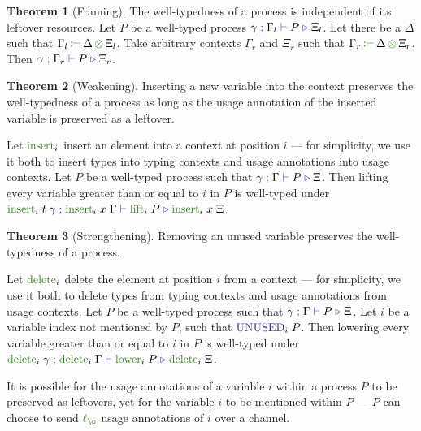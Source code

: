 \documentclass[a4paper,UKenglish,cleveref,autoref,thm-restate,authorcolumns]{lipics-v2019}
\theoremstyle{definition}
\newtheorem{nitheorem}{Theorem}
\newcommand{\type}[1]{\textcolor{BlueViolet}{\operatorname{#1}}}
\newcommand{\func}[1]{\textcolor{OliveGreen}{\operatorname{#1}}}
\newcommand{\opctx}[3]{#1 \, \func{\coloneqq} \, #2 \, \func{\otimes} \, #3}
\newcommand{\lz}{\func{\ell_{\o}}}
\newcommand{\types}[4]{#1 \; \type{;} \; #2 \; \type{\vdash} \; #3 \; \type{\triangleright} \; #4}
\newcommand{\Unused}{\type{UNUSED}}
\begin{document}
\begin{nitheorem}[Framing]
  \label{thm:framing}
  The well-typedness of a process is independent of its leftover resources.
  Let $P$ be a well-typed process $\types{\gamma}{\Gamma_l}{P}{\Xi_l}$.
  Let there be a $\Delta$ such that $\opctx{\Gamma_l}{\Delta}{\Xi_l}$.
  Take arbitrary contexts $\Gamma_r$ and $\Xi_r$ such that $\opctx{\Gamma_r}{\Delta}{\Xi_r}$.
  Then $\types{\gamma}{\Gamma_r}{P}{\Xi_r}$.
\end{nitheorem}

\begin{nitheorem}[Weakening]
  \label{thm:weakening}
  Inserting a new variable into the context preserves the well-typedness of a process as long as the usage annotation of the inserted variable is preserved as a leftover.

  Let $\func{insert}_i$ insert an element into a context at position $i$ --- for simplicity, we use it both to insert types into typing contexts and usage annotations into usage contexts.
  Let $P$ be a well-typed process such that $\types{\gamma}{\Gamma}{P}{\Xi}$.
  Then lifting every variable greater than or equal to $i$ in $P$ is well-typed under $\types{\func{insert}_i \; t \; \gamma}{\func{insert}_i \; x \; \Gamma}{\func{lift}_i \; P}{\func{insert}_i \; x \; \Xi}$.
\end{nitheorem}

\begin{nitheorem}[Strengthening]
  \label{thm:strengthening}
  Removing an unused variable preserves the well-typedness of a process.

  Let $\func{delete}_i$ delete the element at position $i$ from a context --- for simplicity, we use it both to delete types from typing contexts and usage annotations from usage contexts.
  Let $P$ be a well-typed process such that $\types{\gamma}{\Gamma}{P}{\Xi}$.
  Let $i$ be a variable index not mentioned by $P$, such that $\Unused_i \; P$.
  Then lowering every variable greater than or equal to $i$ in $P$ is well-typed under $\types{\func{delete}_i \; \gamma}{\func{delete}_i \; \Gamma}{\func{lower}_i \; P}{\func{delete}_i \; \Xi}$.
\end{nitheorem}

\begin{remark}
  It is possible for the usage annotations of a variable $i$ within a process $P$ to be preserved as leftovers, yet for the variable $i$ to be mentioned within $P$ --- $P$ can choose to send $\lz$ usage annotations of $i$ over a channel.
\end{remark}
\end{document}

